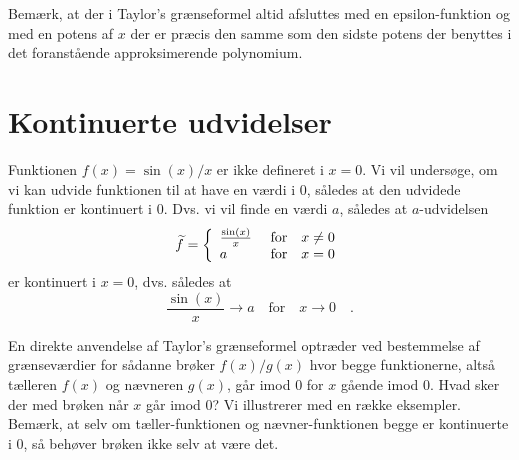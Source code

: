 \begin{aha}
Bemærk, at der i Taylor's grænseformel altid afsluttes med en epsilon-funktion og med en potens af $x$ der er præcis den samme som den sidste potens der benyttes i det foranstående approksimerende polynomium.
\end{aha}


\section{Kontinuerte udvidelser} \label{secKontUdvid}
Funktionen $f(x) = \sin(x)/x$ er ikke defineret i $x=0$. Vi vil undersøge, om vi kan udvide funktionen til at have en værdi i $0$, således at den udvidede funktion er kontinuert i $0$. Dvs. vi vil finde en værdi $a$, således at $a$-udvidelsen
\begin{equation}
\widetilde{f} = \left\{
        \begin{array}{ll}
         \frac{\sin(x)}{x} \, \,  & \hbox{for} \quad x \neq 0 \\
          a \, \, & \hbox{for} \quad x = 0
        \end{array}
      \right.
\end{equation}
er kontinuert i $x=0$, dvs. således at
\begin{equation}
 \frac{\sin(x)}{x} \to a \quad \textrm{for} \quad  x \to 0 \quad.
\end{equation}


En direkte anvendelse af Taylor's grænseformel optræder ved bestemmelse af grænseværdier for sådanne brøker $f(x)/g(x)$ hvor begge funktionerne,
altså tælleren $f(x)$ og nævneren $g(x)$, går imod $0$ for $x$ gående imod $0$. Hvad sker der med brøken når $x$ går imod $0$? Vi illustrerer  med en række eksempler. Bemærk, at selv om tæller-funktionen og nævner-funktionen begge er kontinuerte i $0$, så behøver brøken ikke selv at være det.

